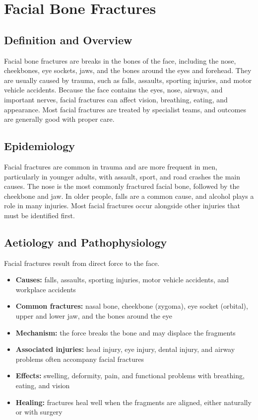 \chapter{Facial Bone Fractures}

\section*{Definition and Overview}
Facial bone fractures are breaks in the bones of the face, including the nose, cheekbones, eye sockets, jaws, and the bones around the eyes and forehead. They are usually caused by trauma, such as falls, assaults, sporting injuries, and motor vehicle accidents. Because the face contains the eyes, nose, airways, and important nerves, facial fractures can affect vision, breathing, eating, and appearance. Most facial fractures are treated by specialist teams, and outcomes are generally good with proper care.

\section*{Epidemiology}
Facial fractures are common in trauma and are more frequent in men, particularly in younger adults, with assault, sport, and road crashes the main causes. The nose is the most commonly fractured facial bone, followed by the cheekbone and jaw. In older people, falls are a common cause, and alcohol plays a role in many injuries. Most facial fractures occur alongside other injuries that must be identified first.

\section*{Aetiology and Pathophysiology}
Facial fractures result from direct force to the face.
\begin{itemize}
    \item \textbf{Causes:} falls, assaults, sporting injuries, motor vehicle accidents, and workplace accidents
    \item \textbf{Common fractures:} nasal bone, cheekbone (zygoma), eye socket (orbital), upper and lower jaw, and the bones around the eye
    \item \textbf{Mechanism:} the force breaks the bone and may displace the fragments
    \item \textbf{Associated injuries:} head injury, eye injury, dental injury, and airway problems often accompany facial fractures
    \item \textbf{Effects:} swelling, deformity, pain, and functional problems with breathing, eating, and vision
    \item \textbf{Healing:} fractures heal well when the fragments are aligned, either naturally or with surgery
\end{itemize}


